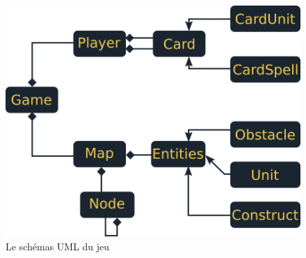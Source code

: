 \documentclass[a4paper, titlepage]{livret}
\begin{document}
    \begin{figure}[th]
      \begin{center}
        \includegraphics[scale=0.4]{Assets/UML.png}
        \caption{Le schémas UML du jeu}
        \label{fig5}
      \end{center}
    \end{figure}
    
\end{document}
